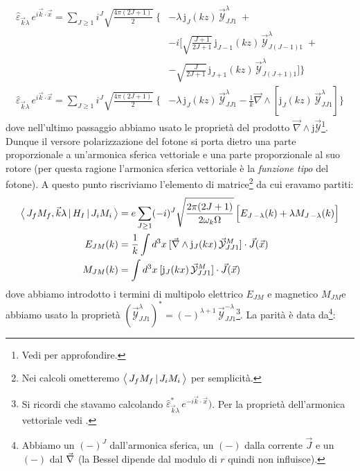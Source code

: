 \begin{displaymath}
\begin{aligned}
\widehat{\varepsilon}_{\vec{k}\lambda}\, e^{i\vec{k}\cdot\vec{x}} = \sum_{J \geq 1} i^J \sqrt{\frac{4\pi (2J+1)}{2}} \;\Biggl \{& -\lambda \,\mathrm{j}_J (kz) \, \vec{\mathcal{Y}}^\lambda_{JJ1}\; + \\
&-i\Biggl [\sqrt{\frac{J+1}{2J+1}} \,\mathrm{j}_{J-1} (kz) \, \vec{\mathcal{Y}}^\lambda_{J(J-1)1}\; + \\
& -\sqrt{\frac{J}{2J+1}} \,\mathrm{j}_{J+1} (kz) \, \vec{\mathcal{Y}}^\lambda_{J(J+1)1} \Biggr ] \Biggr \} \\
%
\widehat{\varepsilon}_{\vec{k}\lambda}\, e^{i\vec{k}\cdot\vec{x}} = \sum_{J \geq 1} i^J \sqrt{\frac{4\pi (2J+1)}{2}} \;\Biggl \{&-\lambda\,\mathrm{j}_J (kz) \, \vec{\mathcal{Y}}^\lambda_{JJ1} - \frac{1}{k} \vec{\nabla}\land [\mathrm{j}_J (kz)\, \vec{\mathcal{Y}}^\lambda_{JJ1}]\Biggr \}
\end{aligned}
\end{displaymath}
dove nell'ultimo passaggio abbiamo usato le proprietà del prodotto $\vec{\nabla}\land \mathrm{j}\vec{\mathcal{Y}}$\footnote{Vedi  per approfondire.}. Dunque il versore polarizzazione del fotone si porta dietro una parte proporzionale a un'armonica sferica vettoriale e una parte proporzionale al suo rotore (per questa ragione l'armonica sferica vettoriale è la \textit{funzione tipo} del fotone). A questo punto riscriviamo l'elemento di matrice\footnote{Nei calcoli ometteremo $\bigl\langle\, J_f M_f\, |\, J_i M_i\, \bigr\rangle$ per semplicità.} da cui eravamo partiti:
\begin{displaymath}
\begin{aligned}
\bigl\langle\, J_f M_f,\vec{k}\lambda\, |\,H_I\, |\,J_i M_i\, \bigr\rangle &= e \sum_{J\geq 1} (-i)^J \sqrt{\frac{2\pi(2J+1)}{2\omega_k\Omega}} \, \Bigl [ E_{J\,-\lambda} (k) + \lambda M_{J\,-\lambda} (k) \Bigr ] \\
E_{JM}(k) &= \frac{1}{k}\int d^3x\: [\vec{\nabla}\land \mathrm{j}_J (kx)\, \vec{\mathcal{Y}}^M_{JJ1}]\cdot \vec{J}(\vec{x}) \\
M_{JM}(k) &= \int d^3x\: [\mathrm{j}_J (kx)\, \vec{\mathcal{Y}}^M_{JJ1}]\cdot \vec{J}(\vec{x}) \\
\end{aligned}
\end{displaymath}
dove abbiamo introdotto i termini di multipolo elettrico $E_{JM}$ e magnetico $M_{JM}$e abbiamo usato la proprietà $(\vec{\mathcal{Y}}^{\lambda}_{JJ1})^* = (-)^{\lambda+1}\,\vec{\mathcal{Y}}^{-\lambda}_{JJ1}$\footnote{Si ricordi che stavamo calcolando $\widehat{\varepsilon}_{\vec{k}\lambda}^*\, e^{-i\vec{k}\cdot\vec{x}})$. Per la proprietà dell'armonica vettoriale vedi .}. La parità è data da\footnote{Abbiamo un $(-)^J$ dall'armonica sferica, un $(-)$ dalla corrente $\vec{J}$ e un $(-)$ dal $\vec{\nabla}$ (la Bessel dipende dal modulo di $r$ quindi non influisce).}:
